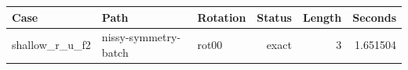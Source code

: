 {\small
\begin{tabular}{lllrrr}
\hline
Case & Path & Rotation & Status & Length & Seconds \\
\hline
shallow\_r\_u\_f2 & nissy-symmetry-batch & rot00 & exact & 3 & 1.651504 \\
\hline
\end{tabular}
}
